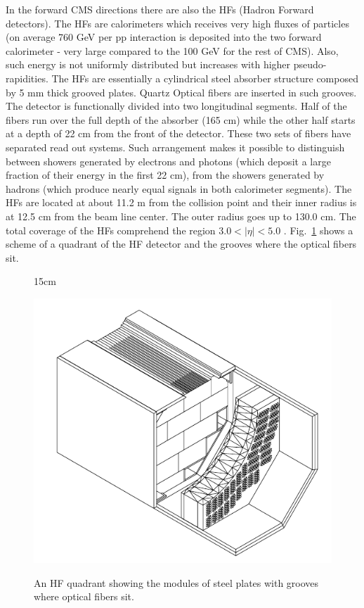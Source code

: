 In the forward CMS directions there are also the HFs (Hadron Forward detectors). The HFs are calorimeters which receives very high fluxes of particles (on average 760 GeV per pp interaction is deposited into the two forward calorimeter - very large compared to the 100 GeV for the rest of CMS). Also, such energy is not uniformly distributed but increases with higher pseudo-rapidities. The HFs are essentially a cylindrical steel absorber structure composed by 5 mm thick grooved plates. Quartz Optical fibers are inserted in such grooves. The detector is functionally divided into two longitudinal segments. Half of the fibers run over the full depth of the absorber (165 cm) while the other half starts at a depth of 22 cm from the front of the detector. These two sets of fibers have separated read out systems. Such arrangement makes it possible to distinguish between showers generated by electrons and photons (which deposit a large fraction of their energy in the first 22 cm), from the showers generated by hadrons (which produce nearly equal signals in both calorimeter segments). The HFs are located at about 11.2 m from the collision point and their inner radius is at 12.5 cm from the beam line center. The outer radius goes up to 130.0 cm. The total coverage of the HFs comprehend the region $3.0 < |\eta| < 5.0$ \cite{bib:JINST-3-362-2008,bib:hcal-tdr-1997}. Fig.~\ref{fig:hcal_hf} shows a scheme of a quadrant of the HF detector and the grooves where the optical fibers sit.

\begin{figure}[htbp]{15cm}
	\caption{An HF quadrant showing the modules of steel plates with grooves where optical fibers sit.}
	\includegraphics[scale=0.5]{ChapterCMS/figs/hcal_hf.png}
	\label{fig:hcal_hf}
\end{figure}


